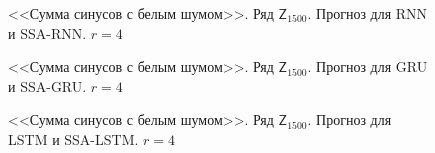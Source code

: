 \documentclass[specialist,
               substylefile = spbu.rtx,
               subf,href,colorlinks=true, 12p]{disser}
\begin{document}
\begin{figure}[H]
	\captionsetup{justification=centering}
	\caption{<<Сумма синусов с белым шумом>>. Ряд $\mathsf{Z}_{1500}$. Прогноз для RNN и SSA-RNN. $r = 4$}
	\label{edsinlen_r4_res_rnn}
\end{figure}

\begin{figure}[H]
	\captionsetup{justification=centering}
	\caption{<<Сумма синусов с белым шумом>>. Ряд $\mathsf{Z}_{1500}$. Прогноз для GRU и SSA-GRU. $r = 4$}
	\label{edsilen_r4_res_gru}
\end{figure}

\begin{figure}[H]
	\captionsetup{justification=centering}
	\caption{<<Сумма синусов с белым шумом>>. Ряд $\mathsf{Z}_{1500}$. Прогноз для LSTM и SSA-LSTM. $r = 4$}
	\label{edsinlen_r4_res_lstm}
\end{figure}
\end{document}
